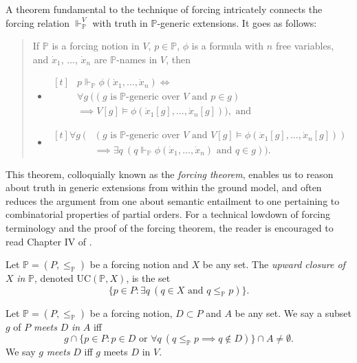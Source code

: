\documentclass[12pt]{article}
\numberwithin{equation}{section}
\begin{document}
\begin{rem}
A theorem fundamental to the technique of forcing intricately connects the forcing relation $\Vdash_{\mathbb{P}}^V$ with truth in $\mathbb{P}$-generic extensions. It goes as follows:
\begin{quote}
If $\mathbb{P}$ is a forcing notion in $V$, $p \in \mathbb{P}$, $\phi$ is a formula with $n$ free variables, and $\dot{x}_1$, ..., $\dot{x}_n$ are $\mathbb{P}$-names in $V$, then
\begin{itemize}
    \item 
    \!
    $\begin{aligned}[t]
    & p \Vdash_{\mathbb{P}} \phi(\dot{x}_1, \dots, \dot{x}_n) \iff \\
    & \forall g \ ((g \text{ is } \mathbb{P} \text{-generic over } V \text{ and } p \in g) \\
    & \implies V[g] \models \phi(\dot{x}_1[g], \dots, \dot{x}_n[g])), \text{ and}
    \end{aligned}$
    \item 
    \!
    $\begin{aligned}[t]
    \forall g \ ( & (g \text{ is } \mathbb{P} \text{-generic over } V \text{ and } V[g] \models \phi(\dot{x}_1[g], \dots, \dot{x}_n[g])) \\
    & \implies \exists q \ (q \Vdash_{\mathbb{P}} \phi(\dot{x}_1, \dots, \dot{x}_n) \text{ and } q \in g)) \text{.}
    \end{aligned}$
\end{itemize}
\end{quote}
This theorem, colloquially known as the \emph{forcing theorem}, enables us to reason about truth in generic extensions from within the ground model, and often reduces the argument from one about semantic entailment to one pertaining to combinatorial properties of partial orders. For a technical lowdown of forcing terminology and the proof of the forcing theorem, the reader is encouraged to read Chapter IV of \cite{kunen}. 
\end{rem}

\begin{defi}
Let $\mathbb{P} = (P, \leq_{\mathbb{P}})$ be a forcing notion and $X$ be any set. The \emph{upward closure of} $X$ \emph{in} $\mathbb{P}$, denoted $\mathrm{UC}(\mathbb{P}, X)$, is the set $$\{p \in P : \exists q \ (q \in X \text{ and } q \leq_{\mathbb{P}} p)\}.$$
\end{defi}

\begin{defi}
Let $\mathbb{P} = (P, \leq_{\mathbb{P}})$ be a forcing notion, $D \subset P$ and $A$ be any set. We say a subset $g$ of $P$ \emph{meets} $D$ \emph{in} $A$ iff $$g \cap \{p \in P : p \in D \text{ or } \forall q \ (q \leq_{\mathbb{P}} p \implies q \not\in D)\} \cap A \neq \emptyset.$$ We say $g$ \emph{meets} $D$ iff $g$ meets $D$ in $V$.
\end{defi}
\end{document}

